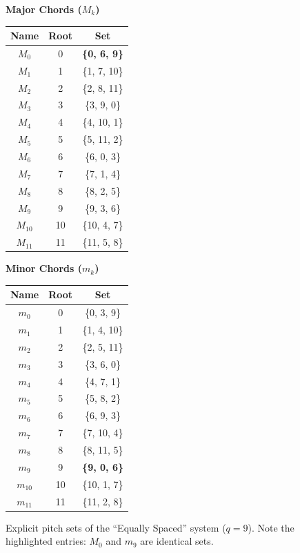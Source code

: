 \documentclass[12pt,letterpaper]{amsart}
\begin{document}
\begin{figure}[H]
\centering
\scriptsize
\begin{minipage}{0.45\textwidth}
\centering
\textbf{Major Chords ($M_k$)}
\begin{tabular}{ccc}
\toprule
Name & Root & \textbf{Set} \\
\midrule
$M_0$ & 0 & \textbf{\{0, 6, 9\}} \\
$M_1$ & 1 & \{1, 7, 10\} \\
$M_2$ & 2 & \{2, 8, 11\} \\
$M_3$ & 3 & \{3, 9, 0\} \\
$M_4$ & 4 & \{4, 10, 1\} \\
$M_5$ & 5 & \{5, 11, 2\} \\
$M_6$ & 6 & \{6, 0, 3\} \\
$M_7$ & 7 & \{7, 1, 4\} \\
$M_8$ & 8 & \{8, 2, 5\} \\
$M_9$ & 9 & \{9, 3, 6\} \\
$M_{10}$ & 10 & \{10, 4, 7\} \\
$M_{11}$ & 11 & \{11, 5, 8\} \\
\bottomrule
\end{tabular}
\end{minipage}
\hfill
\begin{minipage}{0.45\textwidth}
\centering
\textbf{Minor Chords ($m_k$)}
\begin{tabular}{ccc}
\toprule
Name & Root & \textbf{Set} \\
\midrule
$m_0$ & 0 & \{0, 3, 9\} \\
$m_1$ & 1 & \{1, 4, 10\} \\
$m_2$ & 2 & \{2, 5, 11\} \\
$m_3$ & 3 & \{3, 6, 0\} \\
$m_4$ & 4 & \{4, 7, 1\} \\
$m_5$ & 5 & \{5, 8, 2\} \\
$m_6$ & 6 & \{6, 9, 3\} \\
$m_7$ & 7 & \{7, 10, 4\} \\
$m_8$ & 8 & \{8, 11, 5\} \\
$m_9$ & 9 & \textbf{\{9, 0, 6\}} \\
$m_{10}$ & 10 & \{10, 1, 7\} \\
$m_{11}$ & 11 & \{11, 2, 8\} \\
\bottomrule
\end{tabular}
\end{minipage}
\caption{Explicit pitch sets of the ``Equally Spaced'' system ($q=9$). Note the highlighted entries: $M_0$ and $m_9$ are identical sets.}
\label{fig:chords_delta3_equal_explicit}
\end{figure}
\end{document}
